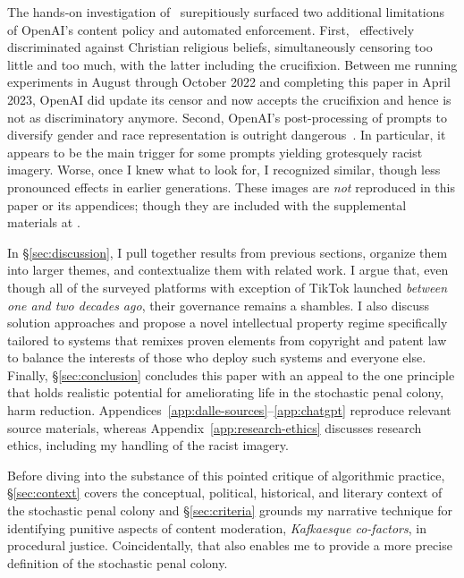 The hands-on investigation of \DALLE\ surepitiously surfaced two additional
limitations of OpenAI's content policy and automated enforcement. First, \DALLE\
effectively discriminated against Christian religious beliefs, simultaneously
censoring too little and too much, with the latter including the crucifixion.
Between me running experiments in August through October 2022 and completing
this paper in April 2023, OpenAI did update its censor and now accepts the
crucifixion and hence is not as discriminatory anymore. Second, OpenAI's
post-processing of prompts to diversify gender and race representation is
outright dangerous~\cite{OpenAI2022e,Sparkes2022}. In particular, it appears to
be the main trigger for some prompts yielding grotesquely racist imagery. Worse,
once I knew what to look for, I recognized similar, though less pronounced
effects in earlier generations. These images are \emph{not} reproduced in this
paper or its appendices; though they are included with the supplemental
materials at \anon{\url{https://github.com/apparebit/penal-colony}}.

In \S\ref{sec:discussion}, I pull together results from previous sections,
organize them into larger themes, and contextualize them with related work. I
argue that, even though all of the surveyed platforms with exception of TikTok
launched \emph{between one and two decades ago}, their governance remains a
shambles. I also discuss solution approaches and propose a novel intellectual
property regime specifically tailored to \V{AI} systems that remixes proven
elements from copyright and patent law to balance the interests of those who
deploy such systems and everyone else. Finally, \S\ref{sec:conclusion} concludes
this paper with an appeal to the one principle that holds realistic potential
for ameliorating life in the stochastic penal colony, harm reduction.
Appendices~\ref{app:dalle-sources}--\ref{app:chatgpt} reproduce relevant source
materials, whereas Appendix~\ref{app:research-ethics} discusses research ethics,
including my handling of the racist imagery.

Before diving into the substance of this pointed critique of algorithmic
practice, \S\ref{sec:context} covers the conceptual, political, historical, and
literary context of the stochastic penal colony and \S\ref{sec:criteria} grounds
my narrative technique for identifying punitive aspects of content moderation,
\emph{Kafkaesque co-factors}, in procedural justice. Coincidentally, that also
enables me to provide a more precise definition of the stochastic penal colony.


